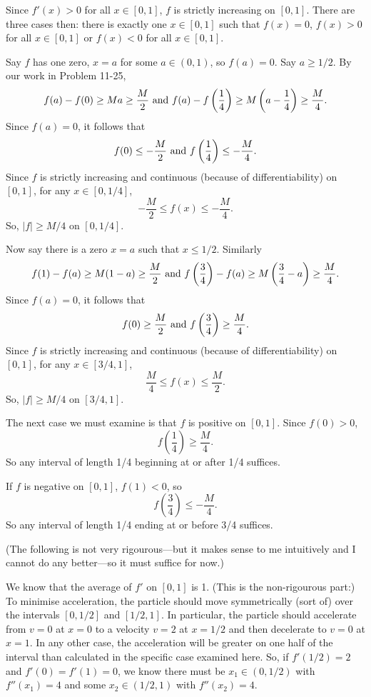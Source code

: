 \begin{problem}[11-26]
Since $f'(x) > 0$ for all $x \in [0, 1]$, $f$ is strictly increasing on $[0, 1]$. There are three cases then: there is exactly one $x \in [0, 1]$ such that $f(x) = 0$, $f(x) > 0$ for all $x \in [0, 1]$ or $f(x) < 0$ for all $x \in [0, 1]$. 

Say $f$ has one zero, $x = a$ for some $a \in (0, 1)$, so $f(a) = 0$. Say $a \ge 1/2$. By our work in Problem 11-25, 
\[ f(a) - f(0) \ge Ma \ge \frac M2\ \textrm{and}\ f(a) - f\left(\frac 14\right) \ge M\left(a-\frac 14\right) \ge \frac M4. \]
Since $f(a) = 0$, it follows that 
\[ f(0) \le -\frac M2\ \rmand\ f\left(\frac 14\right) \le -\frac M4. \]
Since $f$ is strictly increasing and continuous (because of differentiability) on $[0, 1]$, for any $x \in [0, 1/4]$,
\[ -\frac M2 \le f(x) \le -\frac M4. \]
So, $|f| \ge M/4$ on $[0, 1/4]$.

Now say there is a zero $x = a$ such that $x \le 1/2$. Similarly 
\[ f(1) - f(a) \ge M(1-a) \ge \frac M2\ \textrm{and}\ f\left(\frac 34\right) - f(a) \ge M\left(\frac 34 - a\right) \ge \frac M4. \]
Since $f(a) = 0$, it follows that 
\[ f(0) \ge \frac M2\ \rmand\ f\left(\frac 34\right) \ge \frac M4. \]
Since $f$ is strictly increasing and continuous (because of differentiability) on $[0, 1]$, for any $x \in [3/4, 1]$,
\[ \frac M4 \le f(x) \le \frac M2. \]
So, $|f| \ge M/4$ on $[3/4, 1]$.

The next case we must examine is that $f$ is positive on $[0, 1]$. Since $f(0) > 0$, 
\[ f\left(\frac 14\right) \ge \frac M4. \]
So any interval of length 1/4 beginning at or after 1/4 suffices. 

If $f$ is negative on $[0, 1]$, $f(1) < 0$, so 
\[ f\left(\frac 34\right) \le -\frac M4. \]
So any interval of length 1/4 ending at or before 3/4 suffices. 
\end{problem}

\begin{problem}[11-39]
(The following is not very rigourous---but it makes sense to me intuitively and I cannot do any better---so it must suffice for now.)

We know that the average of $f'$ on $[0, 1]$ is 1. (This is the non-rigourous part:) To minimise acceleration, the particle should move symmetrically (sort of) over the intervals $[0, 1/2]$ and $[1/2, 1]$. In particular, the particle should accelerate from $v = 0$ at $x = 0$ to a velocity $v = 2$ at $x = 1/2$ and then decelerate to $v = 0$ at $x = 1$. In any other case, the acceleration will be greater on one half of the interval than calculated in the specific case examined here. So, if $f'(1/2) = 2$ and $f'(0) = f'(1) = 0$, we know there must be $x_1 \in (0, 1/2)$ with $f''(x_1) = 4$ and some $x_2 \in (1/2, 1)$ with $f''(x_2) = 4$. 
\end{problem}

